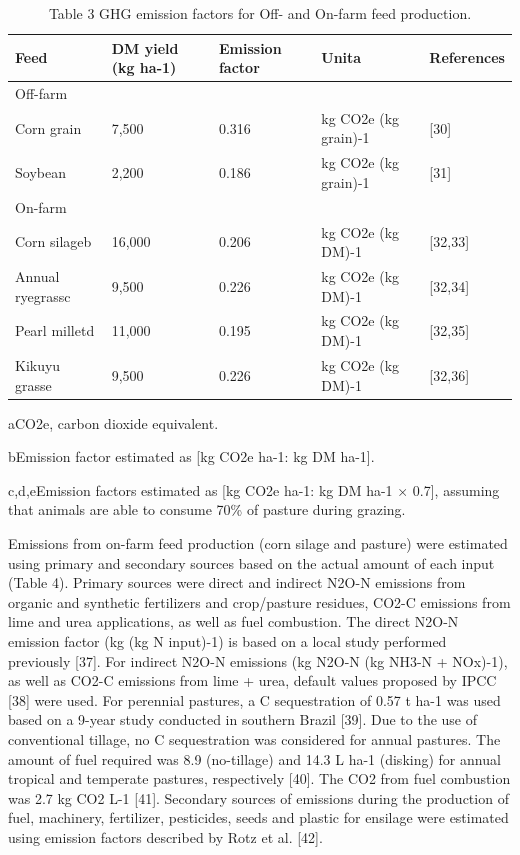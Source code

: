 \documentclass[11pt,a4paper]{article}
\begin{document}
\begin{table}[h]
\caption{Table 3 GHG emission factors for Off- and On-farm feed production.}
\begin{tabular}{|l|l|l|l|l|}
\hline
Feed & DM yield (kg ha-1) & Emission factor & Unita & References \\ \hline
Off-farm &  &  &  &  \\ \hline
Corn grain & 7,500 & 0.316 & kg CO2e (kg grain)-1 & [30] \\ \hline
Soybean & 2,200 & 0.186 & kg CO2e (kg grain)-1 & [31] \\ \hline
On-farm &  &  &  &  \\ \hline
Corn silageb & 16,000 & 0.206 & kg CO2e (kg DM)-1 & [32,33] \\ \hline
Annual ryegrassc & 9,500 & 0.226 & kg CO2e (kg DM)-1 & [32,34] \\ \hline
Pearl milletd & 11,000 & 0.195 & kg CO2e (kg DM)-1 & [32,35] \\ \hline
Kikuyu grasse & 9,500 & 0.226 & kg CO2e (kg DM)-1 & [32,36] \\ \hline
\end{tabular}
\end{table}

aCO2e, carbon dioxide equivalent.

bEmission factor estimated as [kg CO2e ha-1: kg DM ha-1].

c,d,eEmission factors estimated as [kg CO2e ha-1: kg DM ha-1 × 0.7], assuming that animals are able to consume 70\% of pasture during grazing.

Emissions from on-farm feed production (corn silage and pasture) were estimated using primary and secondary sources based on the actual amount of each input (Table 4). Primary sources were direct and indirect N2O-N emissions from organic and synthetic fertilizers and crop/pasture residues, CO2-C emissions from lime and urea applications, as well as fuel combustion. The direct N2O-N emission factor (kg (kg N input)-1) is based on a local study performed previously [37]. For indirect N2O-N emissions (kg N2O-N (kg NH3-N + NOx)-1), as well as CO2-C emissions from lime + urea, default values proposed by IPCC [38] were used. For perennial pastures, a C sequestration of 0.57 t ha-1 was used based on a 9-year study conducted in southern Brazil [39]. Due to the use of conventional tillage, no C sequestration was considered for annual pastures. The amount of fuel required was 8.9 (no-tillage) and 14.3 L ha-1 (disking) for annual tropical and temperate pastures, respectively [40]. The CO2 from fuel combustion was 2.7 kg CO2 L-1 [41]. Secondary sources of emissions during the production of fuel, machinery, fertilizer, pesticides, seeds and plastic for ensilage were estimated using emission factors described by Rotz et al. [42].
\end{document}
